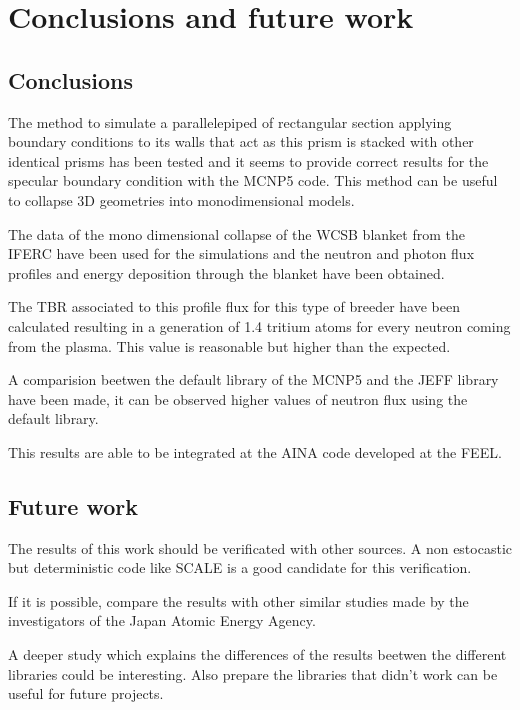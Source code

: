 \setlength\topmargin{8mm}
\onehalfspacing
\chapter{Conclusions and future work} %

\label{Chapter6} %


\section{Conclusions}

The method to simulate a parallelepiped of rectangular section applying boundary conditions to its walls that act as this prism is stacked with other identical prisms has been tested and it seems to provide correct results for the specular boundary condition with the MCNP5 code. This method can be useful to collapse 3D geometries into monodimensional models.

The data of the mono dimensional collapse of the WCSB blanket from the IFERC have been used for the simulations and the neutron and photon flux profiles and energy deposition through the blanket have been obtained.

The TBR associated to this profile flux for this type of breeder have been calculated resulting in a generation of 1.4 tritium atoms for every neutron coming from the plasma. This value is reasonable but higher than the expected.

A comparision beetwen the default library of the MCNP5 and the JEFF library have been made, it can be observed higher values of neutron flux using the default library. 

This results are able to be integrated at the AINA code developed at the FEEL.

\section{Future work}

The results of this work should be verificated with other sources. A non estocastic but deterministic code like SCALE is a good candidate for this verification.

If it is possible, compare the results with other similar studies made by the investigators of the Japan Atomic Energy Agency.

A deeper study which explains the differences of the results beetwen the different libraries could be interesting. Also prepare the libraries that didn't work can be useful for future projects.

 